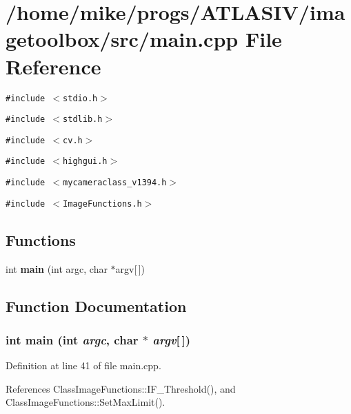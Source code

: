 \section{/home/mike/progs/ATLASIV/imagetoolbox/src/main.cpp File Reference}
\label{main_8cpp}
{\tt \#include $<$stdio.h$>$}\par
{\tt \#include $<$stdlib.h$>$}\par
{\tt \#include $<$cv.h$>$}\par
{\tt \#include $<$highgui.h$>$}\par
{\tt \#include $<$mycameraclass\_\-v1394.h$>$}\par
{\tt \#include $<$Image\-Functions.h$>$}\par
\subsection*{Functions}
\begin{CompactItemize}
\item 
int {\bf main} (int argc, char $\ast$argv[$\,$])
\end{CompactItemize}


\subsection{Function Documentation}
\subsubsection{\setlength{\rightskip}{0pt plus 5cm}int main (int {\em argc}, char $\ast$ {\em argv}[$\,$])}\label{main_8cpp_a0}


Definition at line 41 of file main.cpp.

References Class\-Image\-Functions::IF\_\-Threshold(), and Class\-Image\-Functions::Set\-Max\-Limit().

